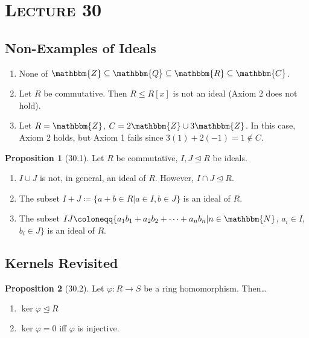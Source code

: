 \documentclass{article}
\newcommand{\N}{\mathbbm{N}}
\newcommand{\Z}{\mathbbm{Z}}
\newcommand{\Q}{\mathbbm{Q}}
\newcommand{\R}{\mathbbm{R}}
\newcommand{\C}{\mathbbm{C}}
\newcommand{\union}{\cup}
\newcommand{\inter}{\cap}
\newcommand{\coleq}{\coloneqq}
\newcommand{\func}[3]{#1: #2 \to #3}
\renewcommand{\Subset}{\subseteq}
\theoremstyle{definition}
\newtheorem*{prop}{Proposition}
\theoremstyle{remark}
\newcommand{\ideal}{\unlhd}
\begin{document}
    \section*{\textbf{\textsc{Lecture 30}}}{
        \subsection*{Non-Examples of Ideals}{
            \begin{enumerate}
                \item None of $\Z \Subset \Q \Subset \R \Subset \C$.
                \item Let $R$ be commutative. Then $R \leq R[x]$ is not an ideal (Axiom 2 does not hold).
                \item Let $R=\Z$, $C=2\Z\union 3\Z$. In this case, Axiom 2 holds, but Axiom 1 fails since $3(1)+2(-1)=1\notin C$.
            \end{enumerate}
        
        \begin{prop}[30.1]
            Let $R$ be commutative, $I,J \ideal R$ be ideals.
            \begin{enumerate}
                \item $I\union J$ is not, in general, an ideal of $R$. However, $I\inter J \ideal R$.
                \item The subset $I+J \coleq \{a+b \in R|a \in I, b \in J\}$ is an ideal of $R$.
                \item The subset $IJ \coleq \{a_1b_1+a_2b_2+\cdots+a_nb_n|n\in \N$, $a_i \in I$, $b_i \in J\}$ is an ideal of $R$.
            \end{enumerate}
        \end{prop}
        }
        \subsection*{Kernels Revisited}{
            \begin{prop}[30.2]
                Let $\func{\varphi}{R}{S}$ be a ring homomorphism. Then\ldots
                \begin{enumerate}
                    \item $\ker\varphi \ideal R$
                    \item $\ker\varphi=0$ iff $\varphi$ is injective.
                \end{enumerate}
            \end{prop}
            
}}
\end{document}
